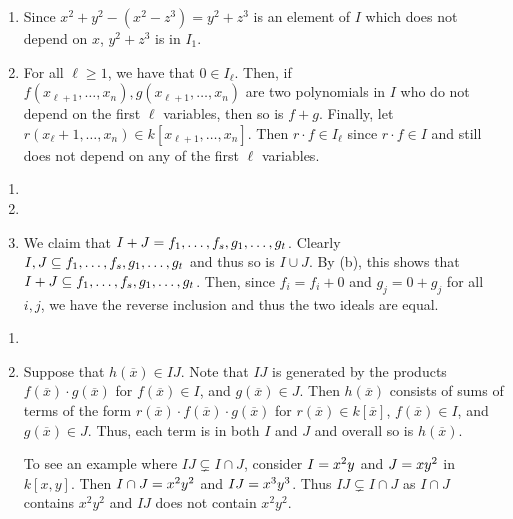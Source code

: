 \documentclass[letterpaper, 11pt, oneside]{book}
\begin{document}
\clearpage

\begin{sol}\label{ex:UAG_1.1.10}
  \begin{enumerate}
    \item Since $x^{2} + y^{2} - (x^{2} - z^{3}) = y^{2} + z^{3}$ is an element of $I$ which does not depend on $x$, $y^{2} + z^{3}$ is in $I_{1}$.
    \item For all $\ell \geq 1$, we have that $0 \in I_{\ell}$.
          Then, if $f(x_{\ell + 1}, \ldots, x_{n}), g(x_{\ell + 1}, \ldots, x_{n})$ are two polynomials in $I$ who do not depend on the first $\ell$ variables, then so is $f + g$.
          Finally, let $r(x_{\ell} + 1, \ldots, x_{n}) \in k[x_{\ell + 1}, \ldots, x_{n}]$.
          Then $r \cdot f \in I_{\ell}$ since $r \cdot f \in I$ and still does not depend on any of the first $\ell$ variables.
  \end{enumerate}
\end{sol}

\begin{sol}\label{ex:UAG_1.1.11}
  \begin{enumerate}
    \item {}
    \item {}
    \item We claim that $I + J = \ideal{f_{1}, \ldots, f_{s}, g_{1}, \ldots, g_{t}}$.
          Clearly $I, J \subseteq \ideal{f_{1}, \ldots, f_{s}, g_{1}, \ldots, g_{t}}$ and thus so is $I \cup J$.
          By (b), this shows that $I + J \subseteq \ideal{f_{1}, \ldots, f_{s}, g_{1}, \ldots, g_{t}}$.
          Then, since $f_{i} = f_{i} + 0$ and $g_{j} = 0 + g_{j}$ for all $i, j$, we have the reverse inclusion and thus the two ideals are equal.
  \end{enumerate}
\end{sol}

\begin{sol}\label{ex:UAG_1.1.12}
  \begin{enumerate}
    \item {}
    \item Suppose that $h(\overline{x}) \in IJ$.
          Note that $IJ$ is generated by the products $f(\overline{x}) \cdot g(\overline{x})$ for $f(\overline{x}) \in I$, and $g(\overline{x}) \in J$.
          Then $h(\overline{x})$ consists of sums of terms of the form $r(\overline{x}) \cdot f(\overline{x}) \cdot g(\overline{x})$ for $r(\overline{x}) \in k[\overline{x}]$, $f(\overline{x}) \in I$, and $g(\overline{x}) \in J$.
          Thus, each term is in both $I$ and $J$ and overall so is $h(\overline{x})$.

          To see an example where $IJ \subsetneq I \cap J$, consider $I = \ideal{x^{2}y}$ and $J = \ideal{xy^{2}}$ in $k[x, y]$.
          Then $I \cap J = \gen{x^{2}y^{2}}$ and $IJ = \gen{x^{3}y^{3}}$.
          Thus $IJ \subsetneq I \cap J$ as $I \cap J$ contains $x^{2}y^{2}$ and $IJ$ does not contain $x^{2}y^{2}$.
  \end{enumerate}
\end{sol}
\end{document}
